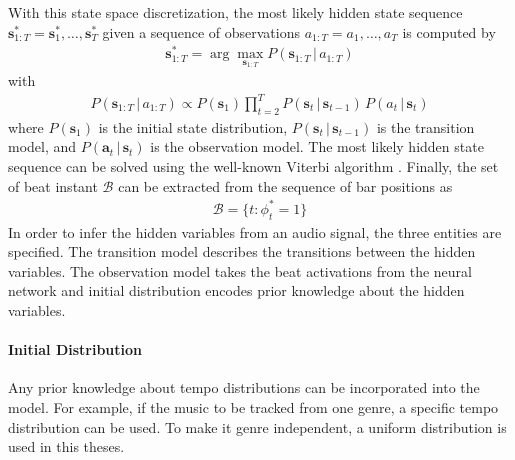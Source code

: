 \documentclass{scrartcl}
\begin{document}
With this state space discretization, the most likely hidden state sequence $\mathbf s_{1:T}^* = \mathbf s_1^*, \dots, \mathbf s_T^*$ given a sequence of observations $a_{1:T} = a_1, \dots, a_T$ is computed by
\begin{align}
\mathbf s_{1:T}^* = \arg \max_{\mathbf s_{1:T}} P(\mathbf s_{1:T}\,|\, a_{1:T})
\label{eq:most_likely_states}
\end{align} 
with 
\begin{align}
 P(\mathbf s_{1:T}\,|\, a_{1:T}) \propto P(\mathbf s_1) \prod_{t=2}^T P(\mathbf s_t\,|\,\mathbf s_{t-1})\, P( a_t\,|\,\mathbf s_{t})
\end{align} 
where $P(\mathbf s_1)$ is the initial state distribution, $P(\mathbf s_t\,|\,\mathbf s_{t-1})$ is the transition model, and $P(\mathbf a_t\,|\,\mathbf s_{t})$ is the observation model. The most likely hidden state sequence can be solved using the well-known Viterbi algorithm \cite{Viterbi1967}. Finally, the set of beat instant $\mathcal B$ can be extracted from the sequence of bar positions as
\begin{align}
\mathcal B = \{ t: \phi_t^*=1\}
\end{align} 
In order to infer the hidden variables from an audio signal, the three entities are specified. The transition model describes the transitions between the hidden variables. The observation model takes the beat activations from the neural network
and initial distribution encodes prior knowledge about the hidden variables.

\paragraph{Initial Distribution} 
Any prior knowledge about tempo distributions can be incorporated into the model. For example, if the music to be tracked from one genre, a specific tempo distribution can be used. To make it genre independent, a uniform distribution is used in this theses. 
\end{document}

